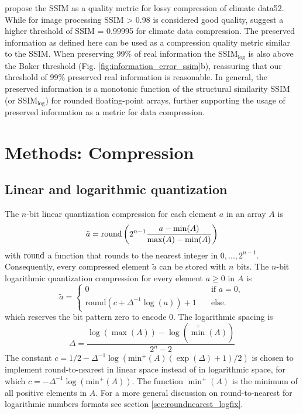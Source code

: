 \cite{Baker2019} propose the SSIM as a quality metric for lossy compression of climate data52. While for image processing
SSIM > 0.98 is considered good quality, \cite{Baker2019} suggest a higher threshold of SSIM = 0.99995 for climate data compression.
The preserved information as defined here can be used as a compression quality metric similar to the SSIM. When preserving 99\%
of real information the SSIM$_{\log}$ is also above the Baker threshold (Fig. \ref{fig:information_error_ssim}b), reassuring that our
threshold of 99\% preserved real information is reasonable. In general, the preserved information is a monotonic function of the
structural similarity SSIM (or SSIM$_{\log}$) for rounded floating-point arrays, further supporting the usage of preserved
information as a metric for data compression. 

\section{Methods: Compression}
\label{sec:compression_methods_compression}

\subsection{Linear and logarithmic quantization}
\label{sec:linlogquantization}

The $n$-bit linear quantization compression for each element $a$ in an array $A$ is
	\begin{equation}
	\tilde{a} = \operatorname{round} \left( 2^{n-1} \frac{a - \min(A)}{\max(A) - \min(A)} \right)
	\end{equation}
with $\operatorname{round}$ a function that rounds to the nearest integer in $0,...,2^{n-1}$. Consequently, every compressed element $\tilde{a}$
can be stored with $n$ bits. The $n$-bit logarithmic quantization compression for every element $a\geq0$ in $A$ is
	\begin{equation}
	\tilde{a} = \begin{cases} 0 \quad &\text{if } a = 0, \\
	\text{round}\left( c + \Delta^{-1}\log(a) \right) + 1 \quad &\text{else.} \end{cases}
	\end{equation}
which reserves the bit pattern zero to encode 0. The logarithmic spacing is
	\begin{equation}
	\Delta = \frac{\log(\max(A)) - \log(\min^+(A))}{2^{n}-2}
	\end{equation}
The constant $c = 1/2 - \Delta^{-1}\log(\text{min}^+(A)(\exp(\Delta)+1)/2)$ is chosen to implement round-to-nearest in linear space
instead of in logarithmic space, for which $c=-\Delta^{-1}\log(\text{min}^+(A))$. The function $\min^+(A)$  is the minimum of all
positive elements in $A$. For a more general discussion on round-to-nearest for logarithmic numbers formats see section
\ref{sec:roundnearest_logfix}.

